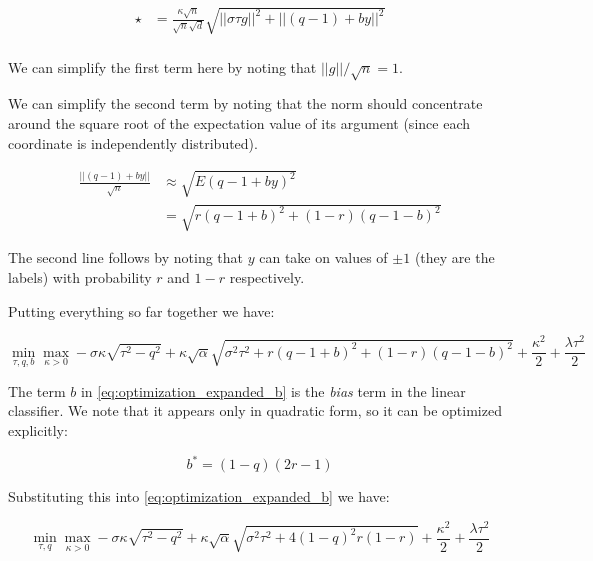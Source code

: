 \begin{equation}
	\begin{split}
		\star &= \frac{\kappa\sqrt{n}}{\sqrt{n}\sqrt{ d}} \sqrt{ \left| \left| \sigma\tau g \right| \right|^2 
	+ \left| \left| \left( q-1 \right) + by \right| \right|^2} \\
\end{split}
\end{equation}

We can simplify the first term here by noting that $ \left| \left| g \right| \right| /\sqrt{n} = 1$.

We can simplify the second term by noting that the norm should concentrate around the square root of the expectation value of its argument (since each coordinate is independently distributed).

\begin{equation}
\begin{split}
	\frac{ \left| \left| \left( q-1 \right) +by \right| \right|}{\sqrt{n}} 
	&\approx \sqrt{E \left( q-1 +by \right)^2} \\
	&= \sqrt{ r \left( q-1+b \right)^2 + \left( 1-r \right) \left( q-1-b \right)^2 }
\end{split}
\end{equation}

The second line follows by noting that $y$ can take on values of $\pm 1$ (they are the labels) with probability $r$ and $1-r$ respectively.

Putting everything so far together we have:

\begin{equation}\label{eq:optimization_expanded_b}
	\min_{\tau, q, b} \max_{\kappa>0} -\sigma\kappa\sqrt{\tau^2 - q^2} + 
	\kappa\sqrt{\alpha}\sqrt{\sigma^2\tau^2 +r \left( q-1+b \right)^2 + \left( 1-r \right) \left( q-1-b \right)^2 } + 
	\frac{\kappa^2}{2} +
	\frac{\lambda\tau^2}{2}
\end{equation}

The term $b$ in \ref{eq:optimization_expanded_b} is the \textit{bias} term in the linear classifier. 
We note that it appears only in quadratic form, so it can be optimized explicitly:

\begin{equation}\label{eq:optimal_b}
b^* = \left( 1-q \right) \left(2r-1  \right)
\end{equation}

Substituting this into \ref{eq:optimization_expanded_b} we have:

\begin{equation}\label{eq:optimization_tau_q_kappa}
	\min_{\tau, q } \max_{\kappa>0} -\sigma\kappa\sqrt{\tau^2 - q^2} + 
	\kappa\sqrt{\alpha}\sqrt{\sigma^2\tau^2 + 4 \left( 1-q \right)^2r \left( 1-r \right)}+ 
	\frac{\kappa^2}{2} +
	\frac{\lambda\tau^2}{2}
\end{equation}

